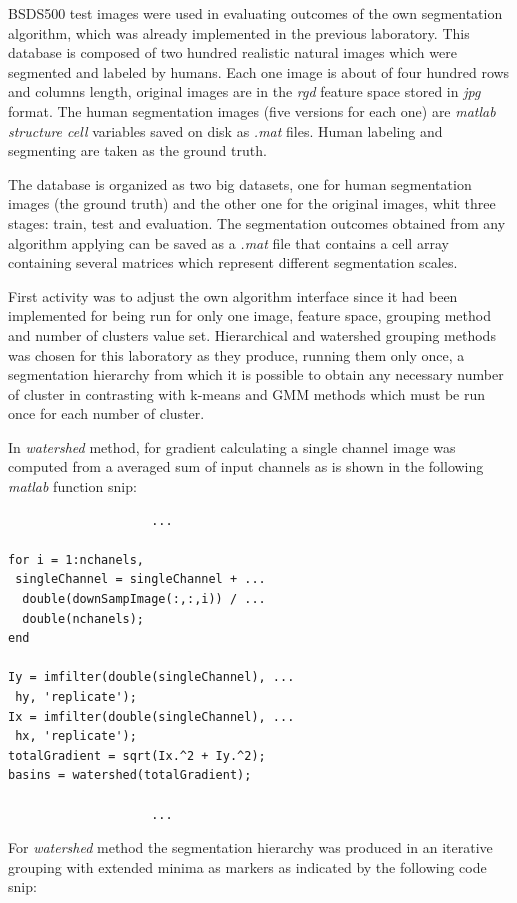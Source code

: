 \documentclass[10pt,twocolumn,letterpaper]{article}
\begin{document}
BSDS500 test images were used in evaluating outcomes of the own segmentation algorithm, which was already implemented in the previous laboratory. This database is composed of two hundred realistic natural images which were segmented and labeled by humans. Each one image is about of four hundred rows and columns length, original images are in the \textit{rgd} feature space stored in \textit{jpg} format. The human segmentation images (five versions for each one) are \textit{matlab structure cell} variables saved on disk as \textit{.mat} files. Human labeling and segmenting are taken as the ground truth.

The database is organized as two big datasets, one for human segmentation images (the ground truth) and the other one for the original images, whit three stages: train, test and evaluation. The segmentation outcomes obtained from any algorithm applying can be saved as a \textit{.mat} file that contains a cell array containing several matrices which represent different segmentation scales.

First activity was to adjust the own algorithm interface since it had been implemented for being run for only one image, feature space, grouping method and number of clusters value set. Hierarchical and watershed grouping methods was chosen for this laboratory as they produce, running them only once, a segmentation hierarchy from which it is possible to obtain any necessary number of cluster in contrasting with k-means and GMM methods which must be run once for each number of cluster.

In \textit{watershed} method, for gradient calculating a single channel image was computed from a averaged sum of input channels as is shown in the following \textit{matlab} function snip:

\begin{verbatim}
                 	...
                	
for i = 1:nchanels,
 singleChannel = singleChannel + ...
  double(downSampImage(:,:,i)) / ...
  double(nchanels);
end

Iy = imfilter(double(singleChannel), ...
 hy, 'replicate');
Ix = imfilter(double(singleChannel), ...
 hx, 'replicate');
totalGradient = sqrt(Ix.^2 + Iy.^2);
basins = watershed(totalGradient);
                    
                    ...
\end{verbatim}


For \textit{watershed} method the segmentation hierarchy was produced in an iterative grouping with extended minima as markers as indicated by the following code snip:
\end{document}
